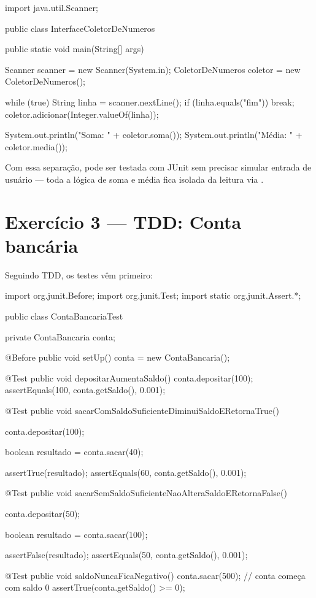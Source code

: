\documentclass[11pt,a4paper]{article}
\begin{document}
\begin{javacode}
import java.util.Scanner;

public class InterfaceColetorDeNumeros {
    public static void main(String[] args) {
        Scanner scanner = new Scanner(System.in);
        ColetorDeNumeros coletor = new ColetorDeNumeros();

        while (true) {
            String linha = scanner.nextLine();
            if (linha.equals("fim")) {
                break;
            }
            coletor.adicionar(Integer.valueOf(linha));
        }

        System.out.println("Soma: " + coletor.soma());
        System.out.println("Média: " + coletor.media());
    }
}
\end{javacode}

\begin{destaque}
Com essa separação,  pode ser testada com JUnit sem precisar simular entrada de usuário --- toda a lógica de soma e média fica isolada da leitura via .
\end{destaque}

\section{Exercício 3 --- TDD: Conta bancária}

Seguindo TDD, os testes vêm primeiro:

\begin{javacode}
import org.junit.Before;
import org.junit.Test;
import static org.junit.Assert.*;

public class ContaBancariaTest {

    private ContaBancaria conta;

    @Before
    public void setUp() {
        conta = new ContaBancaria();
    }

    @Test
    public void depositarAumentaSaldo() {
        conta.depositar(100);
        assertEquals(100, conta.getSaldo(), 0.001);
    }

    @Test
    public void sacarComSaldoSuficienteDiminuiSaldoERetornaTrue() {
        conta.depositar(100);

        boolean resultado = conta.sacar(40);

        assertTrue(resultado);
        assertEquals(60, conta.getSaldo(), 0.001);
    }

    @Test
    public void sacarSemSaldoSuficienteNaoAlteraSaldoERetornaFalse() {
        conta.depositar(50);

        boolean resultado = conta.sacar(100);

        assertFalse(resultado);
        assertEquals(50, conta.getSaldo(), 0.001);
    }

    @Test
    public void saldoNuncaFicaNegativo() {
        conta.sacar(500); // conta começa com saldo 0
        assertTrue(conta.getSaldo() >= 0);
    }
}
\end{javacode}
\end{document}
